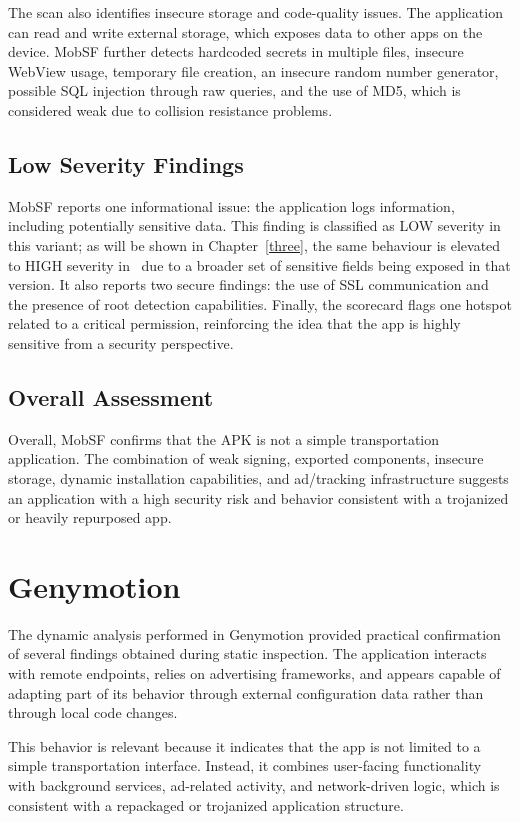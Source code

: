 The scan also identifies insecure storage and code-quality issues. The application can read and write external storage, which exposes data to other apps on the device. MobSF further detects hardcoded secrets in multiple files, insecure WebView usage, temporary file creation, an insecure random number generator, possible SQL injection through raw queries, and the use of MD5, which is considered weak due to collision resistance problems.

\subsection{Low Severity Findings}

MobSF reports one informational issue: the application logs information, including potentially sensitive data. This finding is classified as LOW severity in this variant; as will be shown in Chapter~\ref{three}, the same behaviour is elevated to HIGH severity in \threer\ due to a broader set of sensitive fields being exposed in that version. It also reports two secure findings: the use of SSL communication and the presence of root detection capabilities. Finally, the scorecard flags one hotspot related to a critical permission, reinforcing the idea that the app is highly sensitive from a security perspective.

\subsection{Overall Assessment}
Overall, MobSF confirms that the APK is not a simple transportation application. The combination of weak signing, exported components, insecure storage, dynamic installation capabilities, and ad/tracking infrastructure suggests an application with a high security risk and behavior consistent with a trojanized or heavily repurposed app.
    \section{Genymotion}

The dynamic analysis performed in Genymotion provided practical confirmation of several findings obtained during static inspection. The application interacts with remote endpoints, relies on advertising frameworks, and appears capable of adapting part of its behavior through external configuration data rather than through local code changes.

This behavior is relevant because it indicates that the app is not limited to a simple transportation interface. Instead, it combines user-facing functionality with background services, ad-related activity, and network-driven logic, which is consistent with a repackaged or trojanized application structure.

